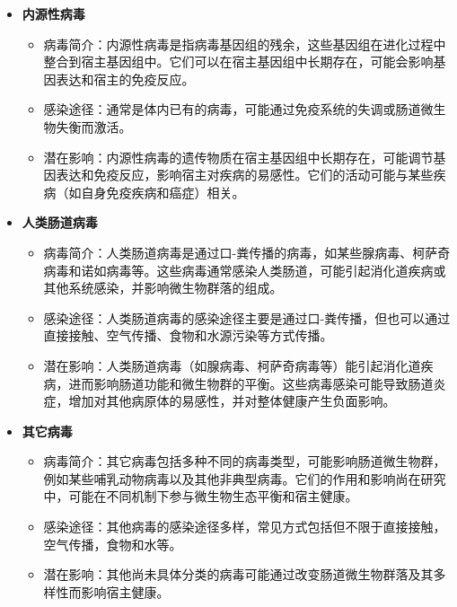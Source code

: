 \documentclass[UTF8]{ctexart}
\begin{document}
\begin{tcolorbox}[
    enhanced,
    colback=lightpurple!10, %
    colframe=white,  %
    arc=3mm,
    boxrule=0.5pt,
    width=\textwidth,
    top=8pt,
    bottom=8pt
]
{\begin{itemize}
    \item \textbf{内源性病毒}
    \begin{itemize}
        \item 病毒简介：内源性病毒是指病毒基因组的残余，这些基因组在进化过程中整合到宿主基因组中。它们可以在宿主基因组中长期存在，可能会影响基因表达和宿主的免疫反应。
        \item 感染途径：通常是体内已有的病毒，可能通过免疫系统的失调或肠道微生物失衡而激活。
        \item 潜在影响：内源性病毒的遗传物质在宿主基因组中长期存在，可能调节基因表达和免疫反应，影响宿主对疾病的易感性。它们的活动可能与某些疾病（如自身免疫疾病和癌症）相关。
    \end{itemize}

    \item \textbf{人类肠道病毒}
    \begin{itemize}
        \item 病毒简介：人类肠道病毒是通过口-粪传播的病毒，如某些腺病毒、柯萨奇病毒和诺如病毒等。这些病毒通常感染人类肠道，可能引起消化道疾病或其他系统感染，并影响微生物群落的组成。
        \item 感染途径：人类肠道病毒的感染途径主要是通过口-粪传播，但也可以通过直接接触、空气传播、食物和水源污染等方式传播。
        \item 潜在影响：人类肠道病毒（如腺病毒、柯萨奇病毒等）能引起消化道疾病，进而影响肠道功能和微生物群的平衡。这些病毒感染可能导致肠道炎症，增加对其他病原体的易感性，并对整体健康产生负面影响。
    \end{itemize}

    \item \textbf{其它病毒}
    \begin{itemize}
        \item 病毒简介：其它病毒包括多种不同的病毒类型，可能影响肠道微生物群，例如某些哺乳动物病毒以及其他非典型病毒。它们的作用和影响尚在研究中，可能在不同机制下参与微生物生态平衡和宿主健康。
        \item 感染途径：其他病毒的感染途径多样，常见方式包括但不限于直接接触，空气传播，食物和水等。
        \item 潜在影响：其他尚未具体分类的病毒可能通过改变肠道微生物群落及其多样性而影响宿主健康。
    \end{itemize}

\end{itemize}

}
\end{tcolorbox}

\newpage
\end{document}
